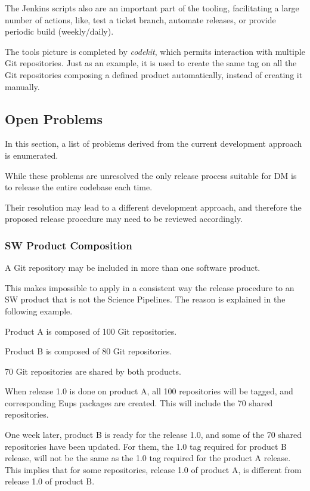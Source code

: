 The Jenkins scripts also are an important part of the tooling, facilitating a large number of actions, like, test a ticket branch, automate releases, or provide periodic build (weekly/daily).

The tools picture is completed by \textit{codekit}, which permits interaction with multiple Git repositories.
Just as an example, it is used to create the same tag on all the Git repositories composing a defined product automatically, instead of creating it manually.


\subsection{Open Problems} \label{sec:openProblems}

In this section, a list of problems derived from the current development approach is enumerated. 

While these problems are unresolved the only release process suitable for DM is to release the entire codebase each time.

Their resolution may lead to a different development approach, and therefore the proposed release procedure may need to be reviewed accordingly.


\subsubsection{SW Product Composition} \label{sec:problemId}

A Git repository may be included in more than one software product.

This makes impossible to apply in a consistent way the release procedure to an SW product that is not the Science Pipelines.
The reason is explained in the following example.

Product A is composed of 100 Git repositories.

Product B is composed of 80 Git repositories.

70 Git repositories are shared by both products.

When release 1.0 is done on product A, all 100 repositories will be tagged, and corresponding Eups packages are created. This will include the 70 shared repositories.

One week later, product B is ready for the release 1.0, and some of the 70 shared repositories have been updated.
For them, the 1.0 tag required for product B release, will not be the same as the 1.0 tag required for the product A release.
This implies that for some repositories, release 1.0 of product A, is different from release 1.0 of product B.

